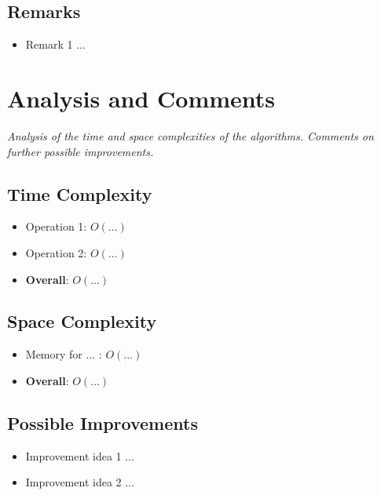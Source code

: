 \documentclass[12pt, a4paper]{report}
\begin{document}
\section{Remarks}
\begin{itemize}
    \item Remark 1 ...
\end{itemize}

\chapter{Analysis and Comments}

\textit{Analysis of the time and space complexities of the algorithms. Comments on further possible improvements.}

\section{Time Complexity}
\begin{itemize}
    \item Operation 1: \(O(\ldots)\)
    \item Operation 2: \(O(\ldots)\)
    \item \textbf{Overall}: \(O(\ldots)\)
\end{itemize}

\section{Space Complexity}
\begin{itemize}
    \item Memory for ... : \(O(\ldots)\)
    \item \textbf{Overall}: \(O(\ldots)\)
\end{itemize}

\section{Possible Improvements}
\begin{itemize}
    \item Improvement idea 1 ...
    \item Improvement idea 2 ...
\end{itemize}

\end{document}
